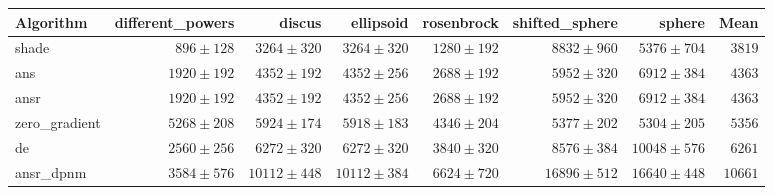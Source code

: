 \begin{tabular}{lrrrrrrr}
\toprule
Algorithm & different\_powers & discus & ellipsoid & rosenbrock & shifted\_sphere & sphere & Mean \\
\midrule
shade & $896 \pm 128$ & $3264 \pm 320$ & $3264 \pm 320$ & $1280 \pm 192$ & $8832 \pm 960$ & $5376 \pm 704$ & $3819$ \\
ans & $1920 \pm 192$ & $4352 \pm 192$ & $4352 \pm 256$ & $2688 \pm 192$ & $5952 \pm 320$ & $6912 \pm 384$ & $4363$ \\
ansr & $1920 \pm 192$ & $4352 \pm 192$ & $4352 \pm 256$ & $2688 \pm 192$ & $5952 \pm 320$ & $6912 \pm 384$ & $4363$ \\
zero\_gradient & $5268 \pm 208$ & $5924 \pm 174$ & $5918 \pm 183$ & $4346 \pm 204$ & $5377 \pm 202$ & $5304 \pm 205$ & $5356$ \\
de & $2560 \pm 256$ & $6272 \pm 320$ & $6272 \pm 320$ & $3840 \pm 320$ & $8576 \pm 384$ & $10048 \pm 576$ & $6261$ \\
ansr\_dpnm & $3584 \pm 576$ & $10112 \pm 448$ & $10112 \pm 384$ & $6624 \pm 720$ & $16896 \pm 512$ & $16640 \pm 448$ & $10661$ \\
\bottomrule
\end{tabular}
